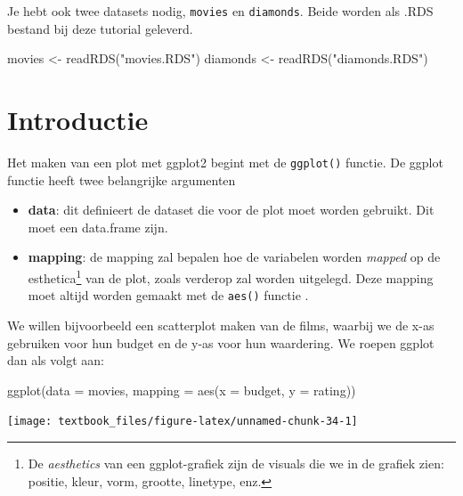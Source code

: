 \documentclass[]{tufte-book}
\newenvironment{Shaded}{}{}
\newcommand{\AttributeTok}[1]{\textcolor[rgb]{0.49,0.56,0.16}{#1}}
\newcommand{\FunctionTok}[1]{\textcolor[rgb]{0.02,0.16,0.49}{#1}}
\newcommand{\NormalTok}[1]{#1}
\newcommand{\OtherTok}[1]{\textcolor[rgb]{0.00,0.44,0.13}{#1}}
\newcommand{\StringTok}[1]{\textcolor[rgb]{0.25,0.44,0.63}{#1}}
\providecommand{\tightlist}{%
  \setlength{\itemsep}{0pt}\setlength{\parskip}{0pt}}
\begin{document}
Je hebt ook twee datasets nodig, \texttt{movies} en \texttt{diamonds}. Beide worden als .RDS bestand bij deze tutorial geleverd.

\begin{Shaded}
\begin{Highlighting}[]
\NormalTok{movies }\OtherTok{\textless{}{-}} \FunctionTok{readRDS}\NormalTok{(}\StringTok{"movies.RDS"}\NormalTok{)}
\NormalTok{diamonds }\OtherTok{\textless{}{-}} \FunctionTok{readRDS}\NormalTok{(}\StringTok{"diamonds.RDS"}\NormalTok{)}
\end{Highlighting}
\end{Shaded}

\hypertarget{introductie}{%
\section{Introductie}\label{introductie}}

Het maken van een plot met ggplot2 begint met de \texttt{ggplot()} functie. De ggplot functie heeft twee belangrijke argumenten

\begin{itemize}
\tightlist
\item
  \textbf{data}: dit definieert de dataset die voor de plot moet worden gebruikt. Dit moet een data.frame zijn.
\item
  \textbf{mapping}: de mapping zal bepalen hoe de variabelen worden \emph{mapped} op de esthetica\footnote{De \emph{aesthetics} van een ggplot-grafiek zijn de visuals die we in de grafiek zien: positie, kleur, vorm, grootte, linetype, enz.} van de plot, zoals verderop zal worden uitgelegd. Deze mapping moet altijd worden gemaakt met de \texttt{aes()} functie .
\end{itemize}

We willen bijvoorbeeld een scatterplot maken van de films, waarbij we de x-as gebruiken voor hun budget en de y-as voor hun waardering. We roepen ggplot dan als volgt aan:

\begin{Shaded}
\begin{Highlighting}[]
\FunctionTok{ggplot}\NormalTok{(}\AttributeTok{data =}\NormalTok{ movies, }\AttributeTok{mapping =} \FunctionTok{aes}\NormalTok{(}\AttributeTok{x =}\NormalTok{ budget, }\AttributeTok{y =}\NormalTok{ rating))}
\end{Highlighting}
\end{Shaded}

\texttt{[image: textbook\_files/figure-latex/unnamed-chunk-34-1]}
\end{document}
